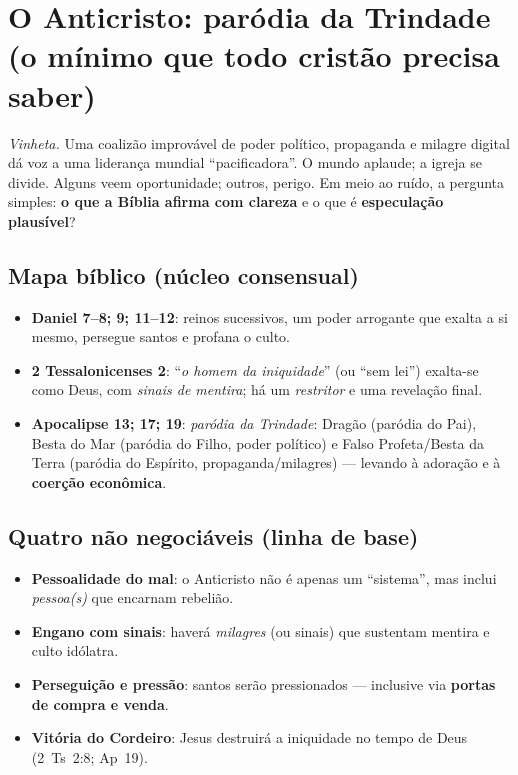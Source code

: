 \chapter{O Anticristo: paródia da Trindade (o mínimo que todo cristão precisa saber)}
\noindent\textit{Vinheta.} Uma coalizão improvável de poder político, propaganda e milagre digital dá voz a uma liderança mundial ``pacificadora''. O mundo aplaude; a igreja se divide. Alguns veem oportunidade; outros, perigo. Em meio ao ruído, a pergunta simples: \textbf{o que a Bíblia afirma com clareza} e o que é \textbf{especulação plausível}?

\section{Mapa bíblico (núcleo consensual)}
\begin{itemize}[leftmargin=*,noitemsep]
  \item \textbf{Daniel 7--8; 9; 11--12}: reinos sucessivos, um poder arrogante que exalta a si mesmo, persegue santos e profana o culto.
  \item \textbf{2 Tessalonicenses 2}: ``\emph{o homem da iniquidade}'' (ou ``sem lei'') exalta-se como Deus, com \emph{sinais de mentira}; há um \emph{restritor} e uma revelação final.
  \item \textbf{Apocalipse 13; 17; 19}: \textit{paródia da Trindade}: Dragão (paródia do Pai), Besta do Mar (paródia do Filho, poder político) e Falso Profeta/Besta da Terra (paródia do Espírito, propaganda/milagres) — levando à adoração e à \textbf{coerção econômica}.
\end{itemize}

\section{Quatro não negociáveis (linha de base)}
\begin{checklist}
\begin{itemize}[leftmargin=*,noitemsep]
  \item \textbf{Pessoalidade do mal}: o Anticristo não é apenas um ``sistema'', mas inclui \emph{pessoa(s)} que encarnam rebelião.
  \item \textbf{Engano com sinais}: haverá \emph{milagres} (ou sinais) que sustentam mentira e culto idólatra.
  \item \textbf{Perseguição e pressão}: santos serão pressionados — inclusive via \textbf{portas de compra e venda}.
  \item \textbf{Vitória do Cordeiro}: Jesus destruirá a iniquidade no tempo de Deus (2~Ts~2:8; Ap~19).
\end{itemize}
\end{checklist}

